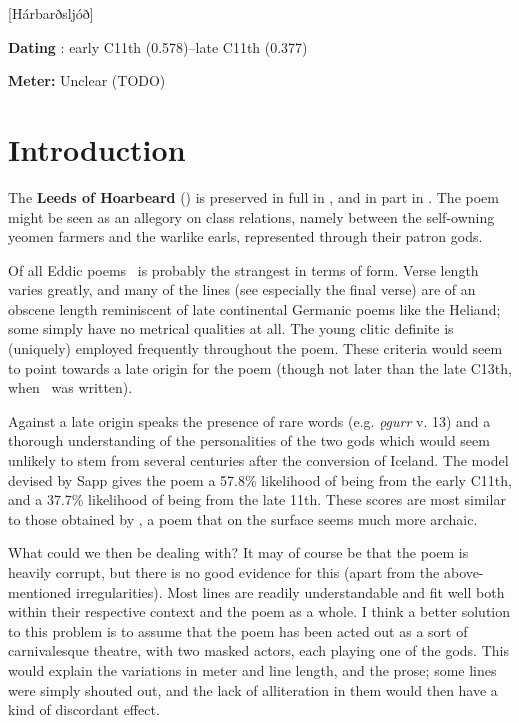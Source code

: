 [Hárbarðsljóð]
\def\thisBookCode{Harbardsljod}

\begin{flushright}%
\textbf{Dating} \parencite{Sapp2022}: early C11th (0.578)–late C11th (0.377)

\textbf{Meter:} Unclear (TODO)%
\end{flushright}

\section{Introduction}

The \textbf{Leeds of Hoarbeard} (\Harbardsljod) is preserved in full in \Regius, and in part in \AM.  The poem might be seen as an allegory on class relations, namely between the self-owning yeomen farmers and the warlike earls, represented through their patron gods.

Of all Eddic poems \Harbardsljod\ is probably the strangest in terms of form. Verse length varies greatly, and many of the lines (see especially the final verse) are of an obscene length reminiscent of late continental Germanic poems like the Heliand; some simply have no metrical qualities at all. The young clitic definite is (uniquely) employed frequently throughout the poem. These criteria would seem to point towards a late origin for the poem (though not later than the late C13th, when \Regius\ was written).

Against a late origin speaks the presence of rare words (e.g. \emph{ǫgurr} v. 13) and a thorough understanding of the personalities of the two gods which would seem unlikely to stem from several centuries after the conversion of Iceland. The model devised by Sapp gives the poem a 57.8\% likelihood of being from the early C11th, and a 37.7\% likelihood of being from the late 11th. These scores are most similar to those obtained by \Gripisspa, a poem that on the surface seems much more archaic.

What could we then be dealing with? It may of course be that the poem is heavily corrupt, but there is no good evidence for this (apart from the above-mentioned irregularities). Most lines are readily understandable and fit well both within their respective context and the poem as a whole. I think a better solution to this problem is to assume that the poem has been acted out as a sort of carnivalesque theatre, with two masked actors, each playing one of the gods. This would explain the variations in meter and line length, and the prose; some lines were simply shouted out, and the lack of alliteration in them would then have a kind of discordant effect.


